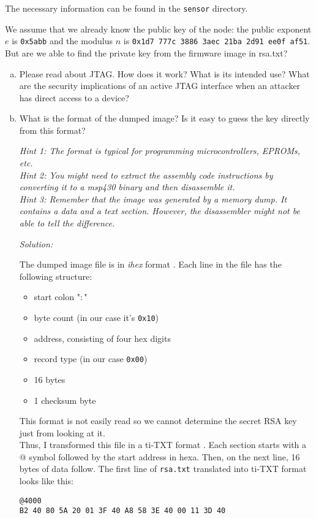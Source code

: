 \documentclass[a4paper,11pt]{article}
\newenvironment{solution}%
{\par{\noindent\small\textit{Solution:}}\vspace{-12pt}\begin{framed}}%
{\end{framed}\par}
\begin{document}
The necessary information can be found in the \texttt{sensor} directory.

We assume that we already know the public key of the node: the public exponent
$e$ is {\tt 0x5abb} and the modulus $n$ is {\tt 0x1d7 777c 3886 3aec 21ba 2d91
ee0f af51}. But are we able to find the private key from the firmware image in
rsa.txt?

\begin{enumerate}[(a)]

\item Please read about JTAG. How does it work? What is its intended use? What
are the security implications of an active JTAG interface when an attacker has
direct access to a device?

\item What is the format of the dumped image? Is it easy to guess the key
directly from this format?

\emph{Hint 1: The format is typical for programming microcontrollers, EPROMs,
etc.}
\\
\emph{Hint 2: You might need to extract the assembly code instructions by converting
it to a msp430 binary and then disassemble it.}
\\
\emph{Hint 3: Remember that the image was generated by a memory dump. It
contains a data and a text section. However, the disassembler might not be able
to tell the difference.}

\ifsolution\begin{solution}
The dumped image file is in \emph{ihex} format \cite{ihex}. Each line in the file
has the following structure:
\begin{itemize}
  \item start colon "$:$"
  \item byte count (in our case it's {\tt 0x10})
  \item address, consisting of four hex digits
  \item record type (in our case {\tt 0x00})
  \item 16 bytes
  \item 1 checksum byte
\end{itemize}

This format is not easily read so we cannot determine the secret RSA key just from
looking at it.\\
Thus, I transformed this file in a ti-TXT format \cite{titxt}. Each section starts
with a $@$ symbol followed by the start address in hexa. Then, on the next line,
16 bytes of data follow. The first line of \texttt{rsa.txt} translated into ti-TXT
format looks like this:
\begin{lstlisting}
@4000
B2 40 80 5A 20 01 3F 40 A8 58 3E 40 00 11 3D 40
\end{lstlisting}


\end{solution}
\end{enumerate}
\end{document}
